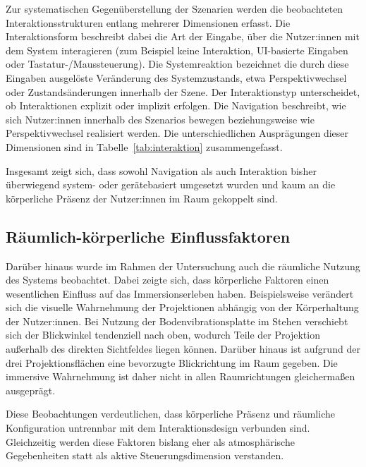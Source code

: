 Zur systematischen Gegenüberstellung der Szenarien werden die beobachteten Interaktionsstrukturen entlang mehrerer Dimensionen erfasst. Die Interaktionsform beschreibt dabei die Art der Eingabe, über die Nutzer:innen mit dem System interagieren (zum Beispiel keine Interaktion, UI-basierte Eingaben oder Tastatur-/Maussteuerung).
Die Systemreaktion bezeichnet die durch diese Eingaben ausgelöste Veränderung des Systemzustands, etwa Perspektivwechsel oder Zustandsänderungen innerhalb der Szene.
Der Interaktionstyp unterscheidet, ob Interaktionen explizit oder implizit erfolgen.
Die Navigation beschreibt, wie sich Nutzer:innen innerhalb des Szenarios bewegen beziehungsweise wie Perspektivwechsel realisiert werden.
Die unterschiedlichen Ausprägungen dieser Dimensionen sind in Tabelle~\ref{tab:interaktion} zusammengefasst.

Insgesamt zeigt sich, dass sowohl Navigation als auch Interaktion bisher überwiegend system- oder gerätebasiert umgesetzt wurden und kaum an die körperliche Präsenz der Nutzer:innen im Raum gekoppelt sind.


\subsection{Räumlich-körperliche Einflussfaktoren}
Darüber hinaus wurde im Rahmen der Untersuchung auch die räumliche Nutzung des Systems beobachtet. Dabei zeigte sich, dass körperliche Faktoren einen wesentlichen Einfluss auf das Immersionserleben haben. 
Beispielsweise verändert sich die visuelle Wahrnehmung der Projektionen abhängig von der Körperhaltung der Nutzer:innen. Bei Nutzung der Bodenvibrationsplatte im Stehen verschiebt sich der Blickwinkel tendenziell nach oben, wodurch Teile der Projektion außerhalb des direkten Sichtfeldes liegen können.
Darüber hinaus ist aufgrund der drei Projektionsflächen eine bevorzugte Blickrichtung im Raum gegeben. Die immersive Wahrnehmung ist daher nicht in allen Raumrichtungen gleichermaßen ausgeprägt.

Diese Beobachtungen verdeutlichen, dass körperliche Präsenz und räumliche Konfiguration untrennbar mit dem Interaktionsdesign verbunden sind. Gleichzeitig werden diese Faktoren bislang eher als atmosphärische Gegebenheiten statt als aktive Steuerungsdimension verstanden.

